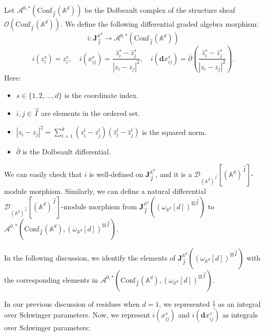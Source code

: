 \documentclass[11pt]{amsart}
\theoremstyle{definition}
\theoremstyle{remark}
\numberwithin{equation}{section}
\begin{document}
Let $\mathcal{A}^{0,*}(\mathrm{Conf}_{\vec{I}}(\mathbb{A}^d))$ be the Dolbeault complex of the structure sheaf $\mathcal{O}(\mathrm{Conf}_{\vec{I}}(\mathbb{A}^{d}))$. We define the following differential graded algebra morphism:
$$
i:\mathbf{J}_{\vec{I}}^{\mathbb{A}^{d}}\rightarrow\mathcal{A}^{0,*}(\mathrm{Conf}_{\vec{I}}(\mathbb{A}^d))
$$
$$
i(z_{i}^{s}) = z_{i}^{s},\quad i(x_{ij}^{s}) = \frac{\bar{z}_{i}^{s} - \bar{z}_{j}^{s}}{|z_{i} - z_{j}|^{2}},\quad i(\mathbf{d}x_{ij}^{s}) = \bar{\partial}\left(\frac{\bar{z}_{i}^{s} - \bar{z}_{j}^{s}}{|z_{i} - z_{j}|^{2}}\right).
$$
Here:
\begin{itemize}
    \item \(s \in \{1,2,\dots,d\}\) is the coordinate index.
    \item \(i, j \in \vec{I}\) are elements in the ordered set.
    \item \(|z_{i} - z_{j}|^{2} = \sum_{t=1}^{d}(z_{i}^{t} - z_{j}^{t})(\bar{z}_{i}^{t} - \bar{z}_{j}^{t})\) is the squared norm.
    \item \(\bar{\partial}\) is the Dolbeault differential.
\end{itemize}

We can easily check that $i$ is well-defined on $\mathbf{J}_{\vec{I}}^{\mathbb{A}^{d}}$, and it is a $\mathcal{D}_{(\mathbb{A}^{d})^{\vec{I}}}[(\mathbb{A}^{d})^{\vec{I}}]$-module morphism. Similarly, we can define a natural differential $\mathcal{D}_{(\mathbb{A}^{d})^{\vec{I}}}[(\mathbb{A}^{d})^{\vec{I}}]$-module morphism from $\mathbf{J}_{\vec{I}}^{\mathbb{A}^{d}}((\omega_{\mathbb{A}^{d}}[d])^{\boxtimes\vec{I}})$ to $\mathcal{A}^{0,*}(\mathrm{Conf}_{\vec{I}}(\mathbb{A}^d),(\omega_{\mathbb{A}^{d}}[d])^{\boxtimes\vec{I}})$.

In the following discussion, we identify the elements of $\mathbf{J}_{\vec{I}}^{\mathbb{A}^{d}}((\omega_{\mathbb{A}^{d}}[d])^{\boxtimes\vec{I}})$ with the corresponding elements in $\mathcal{A}^{0,*}(\mathrm{Conf}_{\vec{I}}(\mathbb{A}^d),(\omega_{\mathbb{A}^{d}}[d])^{\boxtimes\vec{I}})$. 

In our previous discussion of residues when $d=1$, we represented $\frac{1}{z}$ as an integral over Schwinger parameters. Now, we represent $i(x_{ij}^{s})$ and $i(\mathbf{d}x_{ij}^{s})$ as integrals over Schwinger parameters:
\end{document}
